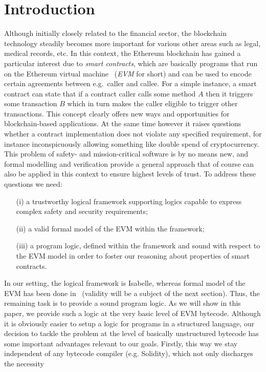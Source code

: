 \documentclass[sigplan,10pt,review]{acmart}\settopmatter{printfolios=true,printccs=false,printacmref=false}
\begin{document}
\section{Introduction}
\label{sec:intro}
Although initially closely related to the financial sector,
the blockchain technology steadily becomes more important for various other areas such as legal, medical records, etc.
In this context, the Ethereum blockchain has gained a particular interest due to \emph{smart contracts}, which are 
basically programs that run on the Ethereum virtual machine~\cite{wood2014ethereum} (\emph{EVM} for short) and can be used to 
encode certain agreements between e.g.\ caller and callee. For a simple instance, a smart contract can
state that if a contract caller calls some method $A$ then it triggers some transaction $B$ which in turn
makes the caller eligible to trigger other transactions. This concept clearly
offers new ways and opportunities for blockchain-based applications. At the same time however it raises  
questions whether a contract implementation does not violate any specified requirement, for instance inconspicuously
allowing something like double spend of cryptocurrency. This problem of safety- and mission-critical
software is by no means new, and formal modelling and verification provide a general approach that 
of course can also be applied in this context to ensure highest levels of trust. 
%
To address these questions we need:
\begin{itemize}
\item[(i)] a trustworthy logical framework supporting logics capable to express complex safety and security
   requirements; 
\item[(ii)] a valid formal model of the EVM within the framework; 
\item[(iii)] a program logic, 
defined within the framework and sound with respect to the EVM model
in order to foster our reasoning about properties of smart contracts. 
\end{itemize}
In our setting, the logical framework is
Isabelle, whereas formal model of the EVM has been done in~\cite{Yoichi} (validity will be
a subject of the next section). Thus, the remaining task 
is to provide a sound program logic. As we will show in this paper, 
we provide such a logic at the very basic level of EVM bytecode. 
Although it is obviously easier to setup a logic for programs in a structured language,
our decision to tackle the problem
at the level of basically unstructured bytecode has some important advantages relevant to our goals.
Firstly, this way we stay independent of any bytecode compiler (e.g. Solidity), which not only discharges the necessity
\end{document}
